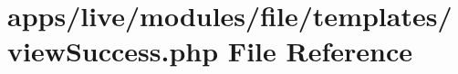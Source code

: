 \hypertarget{live_2modules_2file_2templates_2view_success_8php}{\section{apps/live/modules/file/templates/view\-Success.php File Reference}
\label{live_2modules_2file_2templates_2view_success_8php}
}
